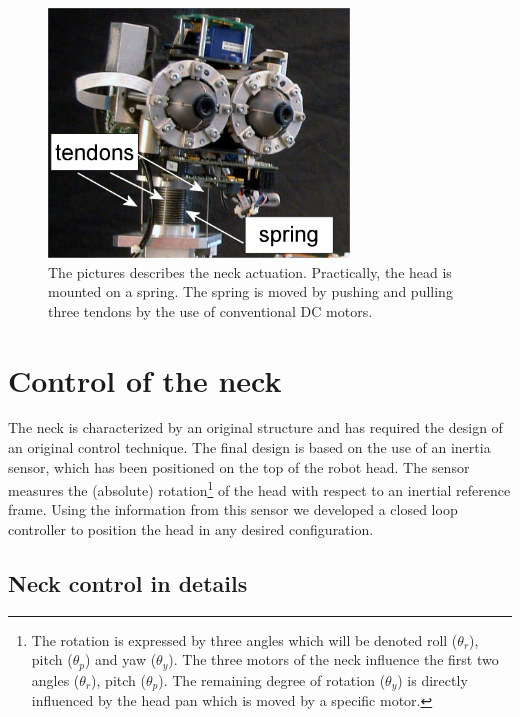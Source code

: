 \begin{figure}[tbp]
\centering
\includegraphics[width=80mm]{Figure/Head.jpg}
\caption{The pictures describes the neck actuation. Practically, the head is mounted on a spring. The spring is moved by pushing and pulling three tendons by the use of conventional DC motors.}
\label{Fig:Head}
\end{figure}

\section{Control of the neck}

The neck is characterized by an original structure and has required the design of an original control technique. The final design is based on the use of an inertia sensor, which has been positioned on the top of the robot head. The sensor measures the (absolute) rotation\footnote{The rotation is expressed by three angles which will be denoted roll ($\theta_r$), pitch ($\theta_p$) and yaw ($\theta_y$). The three motors of the neck influence the first two angles ($\theta_r$), pitch ($\theta_p$). The remaining degree of rotation ($\theta_y$) is directly influenced by the head pan which is moved by a specific motor.} of the head with respect to an inertial reference frame. Using the information from this sensor we developed a closed loop controller to position the head in any desired configuration. 

\subsection{Neck control in details}

